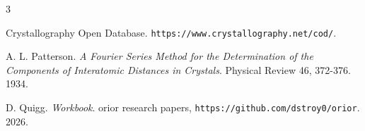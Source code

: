 \backmatter
{}
\begin{thebibliography}{3}

Crystallography Open Database. \texttt{https:/\allowbreak{}/\allowbreak{}www.crystallography.net/\allowbreak{}cod/\allowbreak{}}.

A. L. Patterson. \emph{A Fourier Series Method for the Determination of the Components of Interatomic Distances in Crystals}. Physical Review 46, 372-376. 1934.

D. Quigg. \emph{Workbook}. orior research papers, \texttt{https:/\allowbreak{}/\allowbreak{}github.com/\allowbreak{}dstroy0/\allowbreak{}orior}. 2026.

\end{thebibliography}
